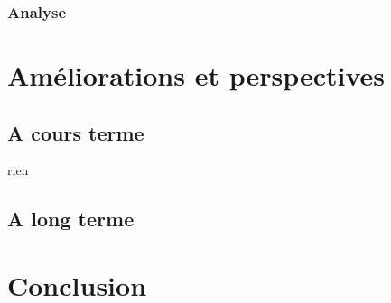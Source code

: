 \documentclass[10pt]{report}
\begin{document}


	\subsection{Analyse}
	
\chapter{Améliorations et perspectives}
	\section{A cours terme}
		rien
	\section{A long terme}
\chapter*{Conclusion} %
\end{document}
